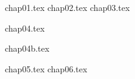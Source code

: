 
\newcommand{\mbeq}{\overset{!}{=}}  %
%
%

%
% 
% 
% 
% 

\frontmatter
{}
%
%
%
%
%
\renewcommand{\contentsname}{Table of Contents}
\tableofcontents*
{}
\mainmatter
{chap01.tex}
\clearemptydoublepage
{chap02.tex}
\clearemptydoublepage
%
{chap03.tex}
\clearemptydoublepage

{chap04.tex}
\clearemptydoublepage

{chap04b.tex}
\clearemptydoublepage

{chap05.tex}
\clearemptydoublepage
%
{chap06.tex}
\clearemptydoublepage
%
%
%
\backmatter

\clearemptydoublepage
%
%   
